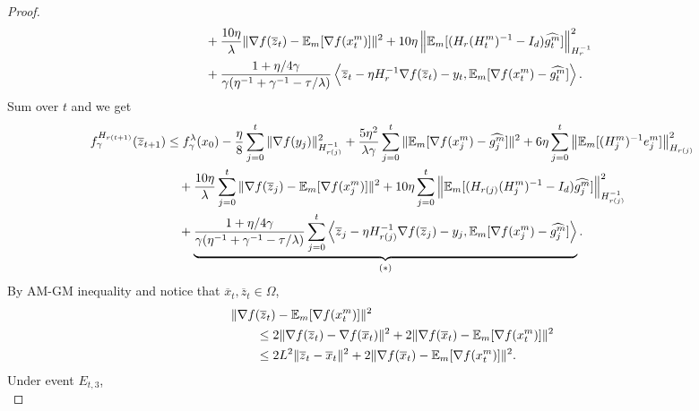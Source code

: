 \documentclass{article} %
\numberwithin{equation}{section}
\begin{document}
\begin{proof}
\begin{equation}
\begin{aligned}
            &\quad + \frac{10\eta}{\lambda} \|\nabla f(\overline{z}_t)-\mathbb{E}_m[\nabla f(x_t^m)]\|^2 + 10\eta\left\|\mathbb{E}_m [(H_r(H_t^m)^{-1}-I_d)\widehat{g_t^m}]\right\|_{H_r^{-1}}^2 \\
            &\quad + \frac{1+\eta/4\gamma}{\gamma(\eta^{-1} +\gamma^{-1}-\tau/\lambda)}\left\langle \overline{z}_{t}-\eta H_r^{-1}\nabla f(\overline{z}_t)-y_t, \mathbb{E}_m[\nabla f(x_t^m)-\widehat{g_t^m}]\right\rangle.
        \end{aligned}
    \end{equation}
    Sum over $t$ and we get 
    \begin{equation}\label{eq:descent_1}
        \begin{aligned}
            f_\gamma^{H_{r(t+1)}}(\overline{z}_{t+1}) 
            &\leq f_{\gamma}^{\lambda}(x_0) - \frac{\eta}{8} \sum_{j=0}^t\|\nabla f(y_j)\|_{H_{r(j)}^{-1}}^2 + \frac{5\eta^2}{\lambda\gamma} \sum_{j=0}^t\|\mathbb{E}_m[\nabla f(x_j^m)-\widehat{g_j^m}]\|^2 + 6\eta \sum_{j=0}^t\left\| \mathbb{E}_m[(H_j^m)^{-1}e_j^m] \right\|_{H_{r(j)}}^2 \\
            &\quad + \frac{10\eta}{\lambda} \sum_{j=0}^t\|\nabla f(\overline{z}_j)-\mathbb{E}_m[\nabla f(x_j^m)]\|^2 + 10\eta \sum_{j=0}^t \left\|\mathbb{E}_m [(H_{r(j)}(H_j^m)^{-1}-I_d)\widehat{g_j^m}]\right\|_{H_{r(j)}^{-1}}^2\\
            &\quad + \underbrace{\frac{1+\eta/4\gamma}{\gamma(\eta^{-1} +\gamma^{-1}-\tau/\lambda)} \sum_{j=0}^t\left\langle \overline{z}_{j}-\eta H_{r(j)}^{-1}\nabla f(\overline{z}_j)-y_j, \mathbb{E}_m[\nabla f(x_j^m)-\widehat{g_j^m}]\right\rangle}_{(*)}.
        \end{aligned}
    \end{equation}
    By AM-GM inequality and notice that $\overline{x}_t, \overline{z}_t\in \Omega$,
    \begin{equation}\label{eq:25}
        \begin{aligned}
            &\|\nabla f(\overline{z}_t)-\mathbb{E}_m[\nabla f(x_t^m)]\|^2 \\
            &\qquad \leq 2\|\nabla f(\overline{z}_t)-\nabla f(\overline{x}_t)\|^2 +  2\|\nabla f(\overline{x}_t)-\mathbb{E}_m[\nabla f(x_t^m)]\|^2 \\
            &\qquad \leq 2L^2\|\overline{z}_t-\overline{x}_t\|^2 +  2\|\nabla f(\overline{x}_t)-\mathbb{E}_m[\nabla f(x_t^m)]\|^2.
        \end{aligned}
    \end{equation}
    Under event $E_{t,3}$,
    \begin{equation}\label{eq:26}

\end{equation}
\end{proof}
\end{document}
